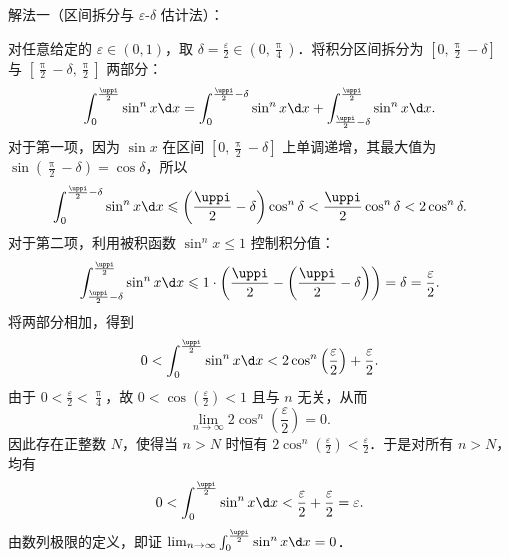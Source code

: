 \begin{solution}
    解法一（区间拆分与 $\varepsilon$-$\delta$ 估计法）：

    对任意给定的 $\varepsilon \in (0, 1)$，取 $\delta = \frac{\varepsilon}{2} \in \left(0, \frac{\uppi}{4}\right)$．将积分区间拆分为 $\left[0, \frac{\uppi}{2} - \delta\right]$ 与 $\left[\frac{\uppi}{2} - \delta, \frac{\uppi}{2}\right]$ 两部分：
    \begin{equation}
        \int_0^{\frac{\uppi}{2}} \sin^n x \d x = \int_0^{\frac{\uppi}{2} - \delta} \sin^n x \d x + \int_{\frac{\uppi}{2} - \delta}^{\frac{\uppi}{2}} \sin^n x \d x.
    \end{equation}
    对于第一项，因为 $\sin x$ 在区间 $\left[0, \frac{\uppi}{2} - \delta\right]$ 上单调递增，其最大值为 $\sin\left(\frac{\uppi}{2} - \delta\right) = \cos\delta$，所以
    \begin{equation}
        \int_0^{\frac{\uppi}{2} - \delta} \sin^n x \d x \leqslant \left(\frac{\uppi}{2} - \delta\right)\cos^n \delta < \frac{\uppi}{2}\cos^n \delta < 2\cos^n \delta.
    \end{equation}
    对于第二项，利用被积函数 $\sin^n x \leqslant 1$ 控制积分值：
    \begin{equation}
        \int_{\frac{\uppi}{2} - \delta}^{\frac{\uppi}{2}} \sin^n x \d x \leqslant 1 \cdot \left( \frac{\uppi}{2} - \left(\frac{\uppi}{2} - \delta\right) \right) = \delta = \frac{\varepsilon}{2}.
    \end{equation}
    将两部分相加，得到
    \begin{equation}
        0 < \int_0^{\frac{\uppi}{2}} \sin^n x \d x < 2\cos^n\left(\frac{\varepsilon}{2}\right) + \frac{\varepsilon}{2}.
    \end{equation}
    由于 $0 < \frac{\varepsilon}{2} < \frac{\uppi}{4}$，故 $0 < \cos\left(\frac{\varepsilon}{2}\right) < 1$ 且与 $n$ 无关，从而
    \begin{equation}
        \lim_{n\to \infty} 2\cos^n\left(\frac{\varepsilon}{2}\right) = 0.
    \end{equation}
    因此存在正整数 $N$，使得当 $n > N$ 时恒有 $2\cos^n\left(\frac{\varepsilon}{2}\right) < \frac{\varepsilon}{2}$．于是对所有 $n > N$，均有
    \begin{equation}
        0 < \int_0^{\frac{\uppi}{2}} \sin^n x \d x < \frac{\varepsilon}{2} + \frac{\varepsilon}{2} = \varepsilon.
    \end{equation}
    由数列极限的定义，即证 $\lim_{n\to \infty} \int_0^{\frac{\uppi}{2}} \sin^n x \d x = 0$．


\end{solution}
